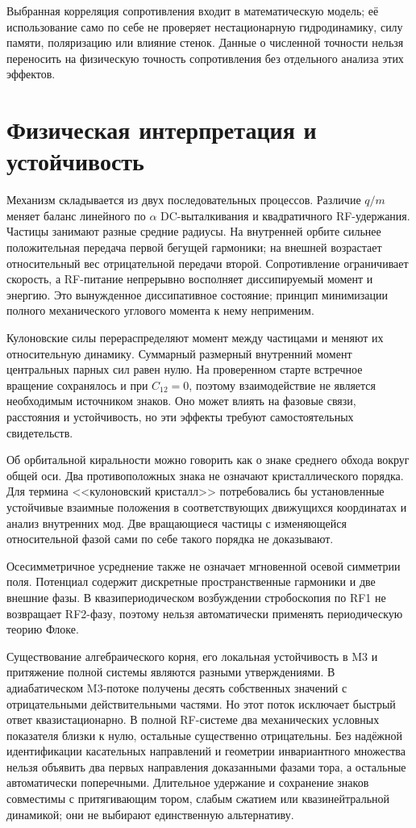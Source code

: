 \documentclass[aip,cha,reprint,a4paper,amsmath,amssymb]{revtex4-2}
\begin{document}
Выбранная корреляция сопротивления входит в математическую модель; её использование само по себе не проверяет нестационарную гидродинамику, силу памяти, поляризацию или влияние стенок. Данные о численной точности нельзя переносить на физическую точность сопротивления без отдельного анализа этих эффектов.

\section{Физическая интерпретация и устойчивость}
Механизм складывается из двух последовательных процессов. Различие $q/m$ меняет баланс линейного по $\alpha$ DC-выталкивания и квадратичного RF-удержания. Частицы занимают разные средние радиусы. На внутренней орбите сильнее положительная передача первой бегущей гармоники; на внешней возрастает относительный вес отрицательной передачи второй. Сопротивление ограничивает скорость, а RF-питание непрерывно восполняет диссипируемый момент и энергию. Это вынужденное диссипативное состояние; принцип минимизации полного механического углового момента к нему неприменим.

Кулоновские силы перераспределяют момент между частицами и меняют их относительную динамику. Суммарный размерный внутренний момент центральных парных сил равен нулю. На проверенном старте встречное вращение сохранялось и при $C_{12}=0$, поэтому взаимодействие не является необходимым источником знаков. Оно может влиять на фазовые связи, расстояния и устойчивость, но эти эффекты требуют самостоятельных свидетельств.

Об орбитальной киральности можно говорить как о знаке среднего обхода вокруг общей оси. Два противоположных знака не означают кристаллического порядка. Для термина <<кулоновский кристалл>> потребовались бы установленные устойчивые взаимные положения в соответствующих движущихся координатах и анализ внутренних мод. Две вращающиеся частицы с изменяющейся относительной фазой сами по себе такого порядка не доказывают.

Осесимметричное усреднение также не означает мгновенной осевой симметрии поля. Потенциал содержит дискретные пространственные гармоники и две внешние фазы. В квазипериодическом возбуждении стробоскопия по RF1 не возвращает RF2-фазу, поэтому нельзя автоматически применять периодическую теорию Флоке.

Существование алгебраического корня, его локальная устойчивость в M3 и притяжение полной системы являются разными утверждениями. В адиабатическом M3-потоке получены десять собственных значений с отрицательными действительными частями. Но этот поток исключает быстрый ответ квазистационарно. В полной RF-системе два механических условных показателя близки к нулю, остальные существенно отрицательны. Без надёжной идентификации касательных направлений и геометрии инвариантного множества нельзя объявить два первых направления доказанными фазами тора, а остальные автоматически поперечными. Длительное удержание и сохранение знаков совместимы с притягивающим тором, слабым сжатием или квазинейтральной динамикой; они не выбирают единственную альтернативу.
\end{document}
